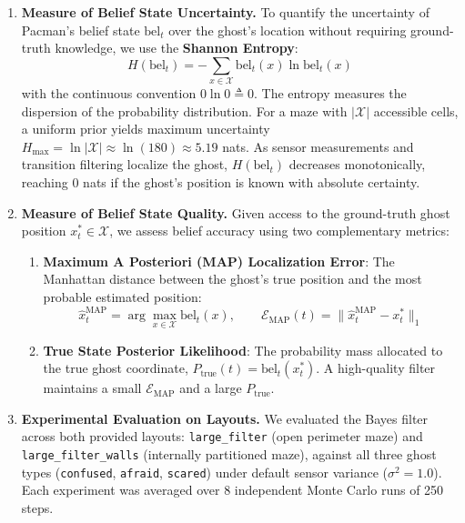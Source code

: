 \documentclass{article}
\begin{document}
\begin{enumerate}[label=\alph*.,leftmargin=*]
    \item \textbf{Measure of Belief State Uncertainty.}
    To quantify the uncertainty of Pacman's belief state $\text{bel}_t$ over the ghost's location without requiring ground-truth knowledge, we use the \textbf{Shannon Entropy}:
    \begin{equation}
        H(\text{bel}_t) = - \sum_{x \in \mathcal{X}} \text{bel}_t(x) \ln \text{bel}_t(x)
    \end{equation}
    with the continuous convention $0 \ln 0 \triangleq 0$. The entropy measures the dispersion of the probability distribution. For a maze with $|\mathcal{X}|$ accessible cells, a uniform prior yields maximum uncertainty $H_{\max} = \ln |\mathcal{X}| \approx \ln(180) \approx 5.19$ nats. As sensor measurements and transition filtering localize the ghost, $H(\text{bel}_t)$ decreases monotonically, reaching $0$ nats if the ghost's position is known with absolute certainty.

    \item \textbf{Measure of Belief State Quality.}
    Given access to the ground-truth ghost position $x_t^* \in \mathcal{X}$, we assess belief accuracy using two complementary metrics:
    \begin{enumerate}[label=(\roman*),leftmargin=*]
        \item \textbf{Maximum A Posteriori (MAP) Localization Error}: The Manhattan distance between the ghost's true position and the most probable estimated position:
        \begin{equation}
            \hat{x}_t^{\text{MAP}} = \arg\max_{x \in \mathcal{X}} \text{bel}_t(x), \qquad \mathcal{E}_{\text{MAP}}(t) = \|\hat{x}_t^{\text{MAP}} - x_t^*\|_1
        \end{equation}
        \item \textbf{True State Posterior Likelihood}: The probability mass allocated to the true ghost coordinate, $P_{\text{true}}(t) = \text{bel}_t(x_t^*)$. A high-quality filter maintains a small $\mathcal{E}_{\text{MAP}}$ and a large $P_{\text{true}}$.
    \end{enumerate}

    \item \textbf{Experimental Evaluation on Layouts.}
    We evaluated the Bayes filter across both provided layouts: \texttt{large\_filter} (open perimeter maze) and \texttt{large\_filter\_walls} (internally partitioned maze), against all three ghost types (\texttt{confused}, \texttt{afraid}, \texttt{scared}) under default sensor variance ($\sigma^2 = 1.0$). Each experiment was averaged over 8 independent Monte Carlo runs of 250 steps.


\end{enumerate}
\end{document}
